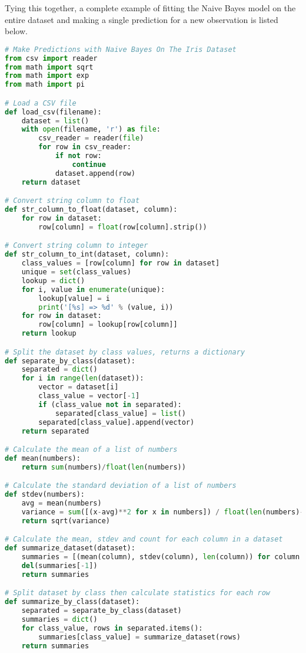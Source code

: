 \documentclass[12pt]{article}
\begin{document}
Tying this together, a complete example of fitting the Naive Bayes model on the entire dataset and making a single prediction for a new observation is listed below.\\

\begin{lstlisting}[language=python]
# Make Predictions with Naive Bayes On The Iris Dataset
from csv import reader
from math import sqrt
from math import exp
from math import pi

# Load a CSV file
def load_csv(filename):
	dataset = list()
	with open(filename, 'r') as file:
		csv_reader = reader(file)
		for row in csv_reader:
			if not row:
				continue
			dataset.append(row)
	return dataset

# Convert string column to float
def str_column_to_float(dataset, column):
	for row in dataset:
		row[column] = float(row[column].strip())

# Convert string column to integer
def str_column_to_int(dataset, column):
	class_values = [row[column] for row in dataset]
	unique = set(class_values)
	lookup = dict()
	for i, value in enumerate(unique):
		lookup[value] = i
		print('[%s] => %d' % (value, i))
	for row in dataset:
		row[column] = lookup[row[column]]
	return lookup

# Split the dataset by class values, returns a dictionary
def separate_by_class(dataset):
	separated = dict()
	for i in range(len(dataset)):
		vector = dataset[i]
		class_value = vector[-1]
		if (class_value not in separated):
			separated[class_value] = list()
		separated[class_value].append(vector)
	return separated

# Calculate the mean of a list of numbers
def mean(numbers):
	return sum(numbers)/float(len(numbers))

# Calculate the standard deviation of a list of numbers
def stdev(numbers):
	avg = mean(numbers)
	variance = sum([(x-avg)**2 for x in numbers]) / float(len(numbers)-1)
	return sqrt(variance)

# Calculate the mean, stdev and count for each column in a dataset
def summarize_dataset(dataset):
	summaries = [(mean(column), stdev(column), len(column)) for column in zip(*dataset)]
	del(summaries[-1])
	return summaries

# Split dataset by class then calculate statistics for each row
def summarize_by_class(dataset):
	separated = separate_by_class(dataset)
	summaries = dict()
	for class_value, rows in separated.items():
		summaries[class_value] = summarize_dataset(rows)
	return summaries


\end{lstlisting}
\end{document}
